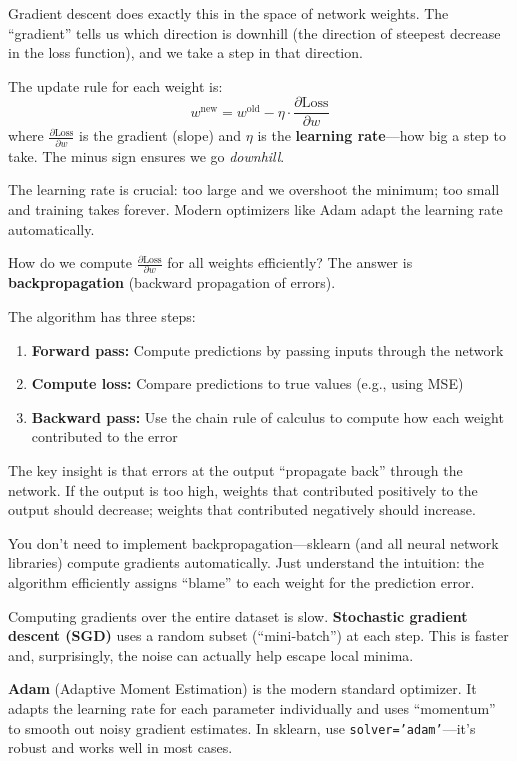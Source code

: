 \documentclass[11pt,a4paper]{article}
\newcommand{\keyword}[1]{\textbf{\textcolor{AccentOrange}{#1}}}
\begin{document}
Gradient descent does exactly this in the space of network weights. The ``gradient'' tells us which direction is downhill (the direction of steepest decrease in the loss function), and we take a step in that direction.

The update rule for each weight is:
\[
w^{\text{new}} = w^{\text{old}} - \eta \cdot \frac{\partial \text{Loss}}{\partial w}
\]
where $\frac{\partial \text{Loss}}{\partial w}$ is the gradient (slope) and $\eta$ is the \keyword{learning rate}---how big a step to take. The minus sign ensures we go \textit{downhill}.

The learning rate is crucial: too large and we overshoot the minimum; too small and training takes forever. Modern optimizers like Adam adapt the learning rate automatically.

How do we compute $\frac{\partial \text{Loss}}{\partial w}$ for all weights efficiently? The answer is \keyword{backpropagation} (backward propagation of errors).

The algorithm has three steps:
\begin{enumerate}
    \item \textbf{Forward pass:} Compute predictions by passing inputs through the network
    \item \textbf{Compute loss:} Compare predictions to true values (e.g., using MSE)
    \item \textbf{Backward pass:} Use the chain rule of calculus to compute how each weight contributed to the error
\end{enumerate}

The key insight is that errors at the output ``propagate back'' through the network. If the output is too high, weights that contributed positively to the output should decrease; weights that contributed negatively should increase.

You don't need to implement backpropagation---sklearn (and all neural network libraries) compute gradients automatically. Just understand the intuition: the algorithm efficiently assigns ``blame'' to each weight for the prediction error.

Computing gradients over the entire dataset is slow. \keyword{Stochastic gradient descent (SGD)} uses a random subset (``mini-batch'') at each step. This is faster and, surprisingly, the noise can actually help escape local minima.

\keyword{Adam} (Adaptive Moment Estimation) is the modern standard optimizer. It adapts the learning rate for each parameter individually and uses ``momentum'' to smooth out noisy gradient estimates. In sklearn, use \texttt{solver='adam'}---it's robust and works well in most cases.
\end{document}
